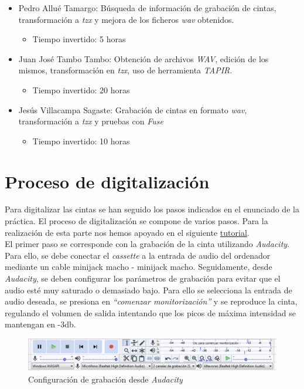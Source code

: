 \documentclass{article}
\begin{document}
\begin{itemize}
    \item Pedro Allué Tamargo: Búsqueda de información de grabación de cintas, transformación a \textit{tzx} y mejora de los ficheros \textit{wav} obtenidos.
        \begin{itemize}
            \item Tiempo invertido: 5 horas
        \end{itemize}
    \item Juan José Tambo Tambo: Obtención de archivos \textit{WAV}, edición de los mismos, transformación en \textit{tzx}, uso de herramienta \textit{TAPIR}.
        \begin{itemize}
            \item Tiempo invertido: 20 horas
        \end{itemize}
    \item Jesús Villacampa Sagaste: Grabación de cintas en formato \textit{wav}, transformación a \textit{tzx} y pruebas con \textit{Fuse}
        \begin{itemize}
            \item Tiempo invertido: 10 horas
        \end{itemize}
\end{itemize}


\section{Proceso de digitalización}


Para digitalizar las cintas se han seguido los pasos indicados en el enunciado de la práctica. El proceso de digitalización se compone de varios pasos. Para la realización de esta parte nos hemos apoyado en el siguiente \href{https://ezcontents.org/zx-spectrum-tape-conversion}{tutorial}.\\

El primer paso se corresponde con la grabación de la cinta utilizando \textit{Audacity}. Para ello, se debe conectar el \textit{cassette} a la entrada de audio del ordenador mediante un cable minijack macho - minijack macho. Seguidamente, desde \textit{Audacity}, se deben configurar los parámetros de grabación para evitar que el audio esté muy saturado o demasiado bajo. Para ello se selecciona la entrada de audio deseada, se presiona en \textit{``comenzar monitorización''} y se reproduce la cinta, regulando el volumen de salida intentando que los picos de máxima intensidad se mantengan en -3db.
\begin{figure}[h!]
    \centering
    \includegraphics[scale=0.5]{images/configuracion-audacity.PNG}
    \caption{Configuración de grabación desde \textit{Audacity}}
    \label{fig:conf-audacity}
\end{figure}
\end{document}

